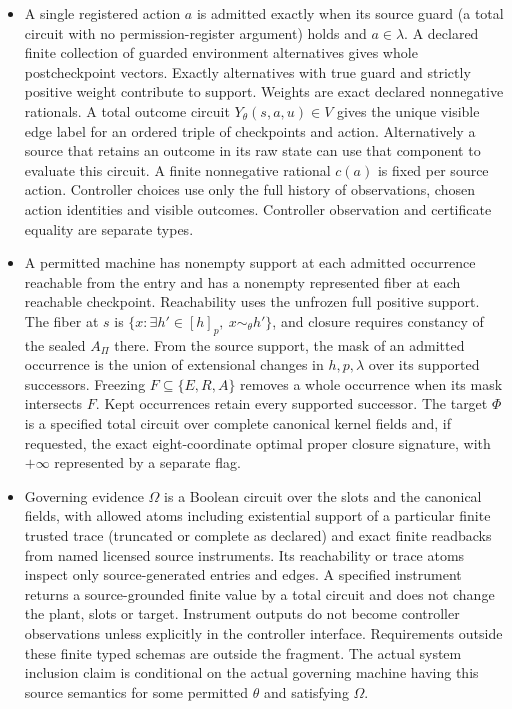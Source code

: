 \begin{theorem}
\begin{itemize}
\item
  A single registered action \(a\) is admitted exactly when its source guard (a total circuit with no permission-register argument) holds and \(a\in\lambda\). A declared finite collection of guarded environment alternatives gives whole postcheckpoint vectors. Exactly alternatives with true guard and strictly positive weight contribute to support. Weights are exact declared nonnegative rationals. A total outcome circuit \(Y_\theta(s,a,u)\in V\) gives the unique visible edge label for an ordered triple of checkpoints and action. Alternatively a source that retains an outcome in its raw state can use that component to evaluate this circuit. A finite nonnegative rational \(c(a)\) is fixed per source action. Controller choices use only the full history of observations, chosen action identities and visible outcomes. Controller observation and certificate equality are separate types.
\item
  A permitted machine has nonempty support at each admitted occurrence reachable from the entry and has a nonempty represented fiber at each reachable checkpoint. Reachability uses the unfrozen full positive support. The fiber at \(s\) is \(\{x:\exists h'\in [h]_p,\ x\sim_\theta h'\}\), and closure requires constancy of the sealed \(A_\Pi\) there. From the source support, the mask of an admitted occurrence is the union of extensional changes in \(h,p,\lambda\) over its supported successors. Freezing \(F\subseteq\{E,R,A\}\) removes a whole occurrence when its mask intersects \(F\). Kept occurrences retain every supported successor. The target \(\Phi\) is a specified total circuit over complete canonical kernel fields and, if requested, the exact eight-coordinate optimal proper closure signature, with \(+\infty\) represented by a separate flag.
\item
  Governing evidence \(\Omega\) is a Boolean circuit over the slots and the canonical fields, with allowed atoms including existential support of a particular finite trusted trace (truncated or complete as declared) and exact finite readbacks from named licensed source instruments. Its reachability or trace atoms inspect only source-generated entries and edges. A specified instrument returns a source-grounded finite value by a total circuit and does not change the plant, slots or target. Instrument outputs do not become controller observations unless explicitly in the controller interface. Requirements outside these finite typed schemas are outside the fragment. The actual system inclusion claim is conditional on the actual governing machine having this source semantics for some permitted \(\theta\) and satisfying \(\Omega\).
\end{itemize}


\end{theorem}
